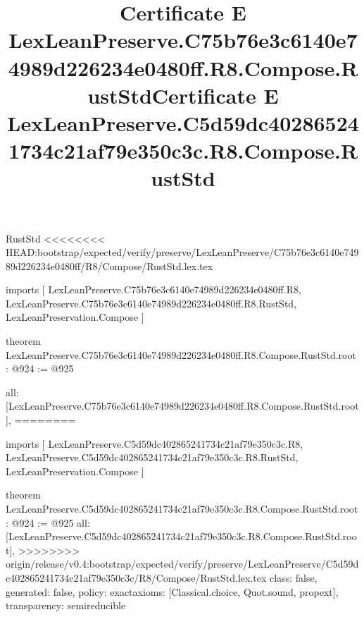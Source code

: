 \begin{lexlean}{RustStd}
<<<<<<<< HEAD:bootstrap/expected/verify/preserve/LexLeanPreserve/C75b76e3c6140e74989d226234e0480ff/R8/Compose/RustStd.lex.tex
\title{Certificate E LexLeanPreserve.C75b76e3c6140e74989d226234e0480ff.R8.Compose.RustStd}
\begin{coremodule}
imports [
  LexLeanPreserve.C75b76e3c6140e74989d226234e0480ff.R8,
  LexLeanPreserve.C75b76e3c6140e74989d226234e0480ff.R8.RustStd,
  LexLeanPreservation.Compose
]

theorem LexLeanPreserve.C75b76e3c6140e74989d226234e0480ff.R8.Compose.RustStd.root : @924 := @925 {
  all: [LexLeanPreserve.C75b76e3c6140e74989d226234e0480ff.R8.Compose.RustStd.root],
========
\title{Certificate E LexLeanPreserve.C5d59dc402865241734c21af79e350c3c.R8.Compose.RustStd}
\begin{coremodule}
imports [
  LexLeanPreserve.C5d59dc402865241734c21af79e350c3c.R8,
  LexLeanPreserve.C5d59dc402865241734c21af79e350c3c.R8.RustStd,
  LexLeanPreservation.Compose
]

theorem LexLeanPreserve.C5d59dc402865241734c21af79e350c3c.R8.Compose.RustStd.root : @924 := @925 {
  all: [LexLeanPreserve.C5d59dc402865241734c21af79e350c3c.R8.Compose.RustStd.root],
>>>>>>>> origin/release/v0.4:bootstrap/expected/verify/preserve/LexLeanPreserve/C5d59dc402865241734c21af79e350c3c/R8/Compose/RustStd.lex.tex
  class: false,
  generated: false,
  policy: exact{axioms: [Classical.choice, Quot.sound, propext]},
  transparency: semireducible
}


\end{coremodule}}
\end{coremodule}
\end{lexlean}
